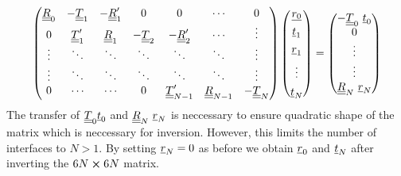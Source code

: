 \begin{equation}
    \begin{pmatrix}
        \underline{\underline{R}}_0         & -\underline{\underline{T}}_1           & -\underline{\underline{R}}_1^\prime &
        0
                             & 0                       & \cdots               &
        0
        \\
        0                    & \underline{\underline{T}}_1^\prime     & \underline{\underline{R}}_1         &
        -\underline{\underline{T}}_2        &
        -\underline{\underline{R}}_2^\prime & \cdots                  & \vdots
        \\
        \vdots               & \ddots                  & \ddots               &
        \ddots               & \ddots                  & \ddots               &
        \vdots
        \\
        \vdots               & \ddots                  & \ddots               &
        \ddots               & \ddots                  & \ddots               &
        \vdots
        \\
        0                    & \cdots                  & \cdots               &
        0
                             & \underline{\underline{T}}_{N-1}^\prime & \underline{\underline{R}}_{N-1}
                             &
        -\underline{\underline{T}}_{N}

    \end{pmatrix}
    \begin{pmatrix}
        \underline{r_0} \\[4pt] \underline{t}_1 \\[4pt] \underline{r}_1 \\[4pt] \vdots
        \\[4pt] \underline{t}_{N}
    \end{pmatrix}
    =
    \begin{pmatrix}
        -\underline{\underline{T}}_0\ \underline{t}_0 \\ 0 \\ \vdots \\ \vdots \\ \underline{\underline{R}}_{N}\
        \underline{r}_N
    \end{pmatrix}
\end{equation}
The transfer of $\underline{\underline{T}}_0\underline{t}_0$ and $\underline{\underline{R}}_{N}\ \underline{r}_N$
is neccessary to ensure quadratic shape of the matrix which is neccessary for
inversion. However, this limits the number of interfaces to $N > 1$.
By setting $\underline{r}_N = 0$ as before we obtain
$\underline{r}_0$ and $\underline{t}_N$ after inverting the $6N\cross 6N$ matrix.